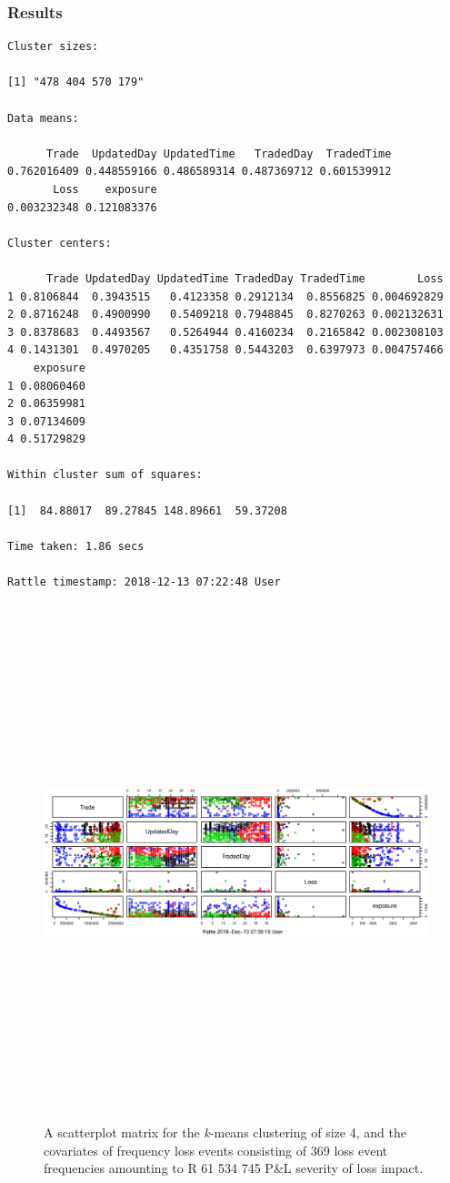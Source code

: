 \documentclass{DissertateUSU}
\begin{document}
\subsubsection{Results}
\begin{verbatim}
Cluster sizes:

[1] "478 404 570 179"

Data means:

      Trade  UpdatedDay UpdatedTime   TradedDay  TradedTime 
0.762016409 0.448559166 0.486589314 0.487369712 0.601539912 
       Loss    exposure 
0.003232348 0.121083376 

Cluster centers:

      Trade UpdatedDay UpdatedTime TradedDay TradedTime        Loss
1 0.8106844  0.3943515   0.4123358 0.2912134  0.8556825 0.004692829
2 0.8716248  0.4900990   0.5409218 0.7948845  0.8270263 0.002132631
3 0.8378683  0.4493567   0.5264944 0.4160234  0.2165842 0.002308103
4 0.1431301  0.4970205   0.4351758 0.5443203  0.6397973 0.004757466
    exposure
1 0.08060460
2 0.06359981
3 0.07134609
4 0.51729829

Within cluster sum of squares:

[1]  84.88017  89.27845 148.89661  59.37208

Time taken: 1.86 secs

Rattle timestamp: 2018-12-13 07:22:48 User
\end{verbatim}

\begin{figure}
\centering
\includegraphics[width=22.5cm, height=15cm]{CA14MeansPlot.eps}
\caption{A scatterplot matrix for the \emph{k}-means clustering of size 4, and the covariates of frequency loss events consisting of 369 loss event frequencies amounting to R 61 534 745 P\&L severity of loss impact.}
\label{CA14MeansPlot}
\end{figure}
\end{document}
